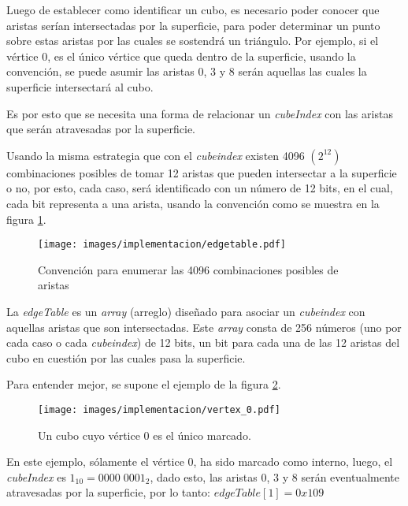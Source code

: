 Luego de establecer como identificar un cubo, es necesario poder conocer que aristas serían intersectadas por la superficie, para poder determinar un punto sobre estas aristas por las cuales se sostendrá un triángulo. Por ejemplo, si el vértice $0$, es el único vértice que queda dentro de la superficie, usando la convención, se puede asumir las aristas $0$, $3$ y $8$ serán aquellas las cuales la superficie intersectará al cubo.

Es por esto que se necesita una forma de relacionar un \emph{cubeIndex} con las aristas que serán atravesadas por la superficie.

Usando la misma estrategia que con el \emph{cubeindex} existen 4096 $(2^{12})$ combinaciones posibles de tomar 12 aristas que pueden intersectar a la superficie o no, por esto, cada caso, será identificado con un número de 12 bits, en el cual, cada bit representa a una arista, usando la convención como se muestra en la figura \ref{f:ch:implementacion:sec:CubeIndex:edgeTable:edge_convention}.

\begin{figure}[hbt]
	\centering
	\fbox
	{
		\texttt{[image: images/implementacion/edgetable.pdf]}
	}
	\caption{Convención para enumerar las 4096 combinaciones posibles de aristas}
	\label{f:ch:implementacion:sec:CubeIndex:edgeTable:edge_convention}
\end{figure}

La \emph{edgeTable} es un \emph{array} (arreglo) diseñado para asociar un \emph{cubeindex} con aquellas aristas que son intersectadas. Este \emph{array} consta de 256 números (uno por cada caso o cada \emph{cubeindex}) de 12 bits, un bit para cada una de las 12 aristas del cubo en cuestión por las cuales pasa la superficie.

Para entender mejor, se supone el ejemplo de la figura \ref{f:ch:implementacion:sec:CubeIndex:edgeTable:vertex_0}.

\begin{figure}[hbt]
	\centering
	\fbox
	{
		\texttt{[image: images/implementacion/vertex\_0.pdf]}
	}
	\caption{Un cubo cuyo vértice $0$ es el único marcado.}
	\label{f:ch:implementacion:sec:CubeIndex:edgeTable:vertex_0}
\end{figure}

En este ejemplo, sólamente el vértice $0$, ha sido marcado como interno, luego, el \emph{cubeIndex} es $1_{10} = 0000 \; 0001_{2}$, dado esto, las aristas $0$, $3$ y $8$ serán eventualmente atravesadas por la superficie, por lo tanto: $edgeTable[1] = 0x109$

